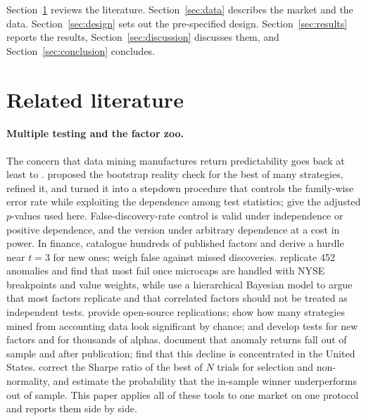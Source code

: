 \documentclass[11pt]{article}
\begin{document}
Section~\ref{sec:lit} reviews the literature. Section~\ref{sec:data} describes the market and the data.
Section~\ref{sec:design} sets out the pre-specified design. Section~\ref{sec:results} reports the results,
Section~\ref{sec:discussion} discusses them, and Section~\ref{sec:conclusion} concludes.

\section{Related literature}\label{sec:lit}

\paragraph{Multiple testing and the factor zoo.}
The concern that data mining manufactures return predictability goes back at least to \citet{lo1990data}.
\citet{white2000reality} proposed the bootstrap reality check for the best of many strategies,
\citet{hansen2005test} refined it, and \citet{romano2005stepwise} turned it into a stepdown procedure that controls
the family-wise error rate while exploiting the dependence among test statistics; \citet{romano2016efficient} give
the adjusted $p$-values used here. False-discovery-rate control \citep{benjamini1995controlling} is valid under
independence or positive dependence, and the \citet{benjamini2001control} version under arbitrary dependence at a
cost in power. In finance, \citet{harvey2016cross} catalogue hundreds of published factors and derive a hurdle near
$t=3$ for new ones; \citet{harvey2020false} weigh false against missed discoveries. \citet{hou2020replicating}
replicate 452 anomalies and find that most fail once microcaps are handled with NYSE breakpoints and value weights,
while \citet{jensen2023replication} use a hierarchical Bayesian model to argue that most factors replicate and that
correlated factors should not be treated as independent tests. \citet{chen2022open} provide open-source
replications; \citet{chordia2020anomalies} show how many strategies mined from accounting data look significant by
chance; \citet{feng2020taming} and \citet{giglio2021thousands} develop tests for new factors and for thousands of
alphas. \citet{mclean2016academic} document that anomaly returns fall out of sample and after publication;
\citet{jacobs2020anomalies} find that this decline is concentrated in the United States. \citet{bailey2014deflated}
correct the Sharpe ratio of the best of $N$ trials for selection and non-normality, and \citet{bailey2017probability}
estimate the probability that the in-sample winner underperforms out of sample. This paper applies all of these
tools to one market on one protocol and reports them side by side.
\end{document}
